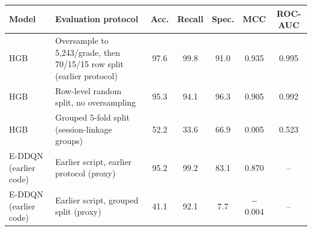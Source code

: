 \begin{tabular}{llccccc}
\toprule
Model & Evaluation protocol & Acc. & Recall & Spec. & MCC & ROC-AUC \\
\midrule
HGB & Oversample to 5,243/grade, then 70/15/15 row split (earlier protocol) & 97.6 & 99.8 & 91.0 & 0.935 & 0.995 \\
HGB & Row-level random split, no oversampling & 95.3 & 94.1 & 96.3 & 0.905 & 0.992 \\
HGB & Grouped 5-fold split (session-linkage groups) & 52.2 & 33.6 & 66.9 & 0.005 & 0.523 \\
E-DDQN (earlier code) & Earlier script, earlier protocol (proxy) & 95.2 & 99.2 & 83.1 & 0.870 & -- \\
E-DDQN (earlier code) & Earlier script, grouped split (proxy) & 41.1 & 92.1 & 7.7 & $-$0.004 & -- \\
\bottomrule
\end{tabular}
